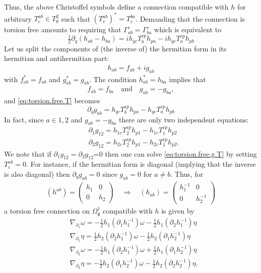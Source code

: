 \documentclass{amsart}
\newcommand{\spacearound}[1]{\quad#1\quad}
\renewcommand{\implies}{\spacearound{\Rightarrow}}
\theoremstyle{definition}
\theoremstyle{remark}
\numberwithin{equation}{section}
\renewcommand{\d}{\partial}
\newcommand{\qand}{\quad\text{and}\quad}
\newcommand{\g}{\mathfrak{g}}
\newcommand{\Omegaoneg}{\Omega^1_{\g}}
\newcommand{\Ttwotheta}{T^2_{\theta}}
\begin{document}
Thus, the above Christoffel symbols define a connection compatible
with $h$ for arbitrary $T^{ab}_c\in\Ttwotheta$ such that
$(T^{ab}_c)^\ast=T^{ba}_c$. Demanding that the connection is torsion
free amounts to requiring that $\Gamma_{ab}^c=\Gamma_{ba}^c$ which is
equivalent to
\begin{equation}\label{eq:torsion.free.T}
  \tfrac{1}{2}\d_q(h_{ab}-h_{ba}) = ih_{qc}T^{cp}_b h_{pa}-ih_{qc}T^{cp}_a h_{pb}
\end{equation}
Let us split the components of (the inverse of) the hermitian form in
its hermitian and antihermitian part:
\begin{align*}
  h_{ab} = f_{ab} + ig_{ab}
\end{align*}
with $f_{ab}^\ast=f_{ab}$ and $g_{ab}^\ast=g_{ab}$. The condition
$h_{ab}^\ast=h_{ba}$ implies that
\begin{align*}
  f_{ab}=f_{ba}\qand
  g_{ab}=-g_{ba},
\end{align*}
and \eqref{eq:torsion.free.T} becomes
\begin{equation}\label{eq:torsion.free.g.T}
  \d_qg_{ab} = h_{qc}T^{cp}_b h_{pa}-h_{qc}T^{cp}_a h_{pb}
\end{equation}
In fact, since $a\in{1,2}$ and $g_{ab}=-g_{ba}$ there are only two
independent equations:
\begin{align}
  &\d_1g_{12} = h_{1c}T^{cp}_2h_{p1}-h_{1c}T^{cp}_1h_{p2}\label{eq:torsionfree.g.1}\\
  &\d_2g_{12} = h_{2c}T^{cp}_2h_{p1}-h_{2c}T^{cp}_1h_{p2}.\label{eq:torsionfree.g.2}
\end{align}
We note that if $\d_1g_{12}=\d_2g_{12}$=0 then one can solve
\eqref{eq:torsion.free.g.T} by setting $T^{ab}_c=0$. For instance, if
the hermitian form is diagonal (implying that the inverse is also
diagonal) then $\d_qg_{ab}=0$ since $g_{ab}=0$ for $a\neq b$. Thus,
for
\begin{align*}
  (h^{ab}) =
  \begin{pmatrix}
    h_1 & 0 \\ 0 & h_2
  \end{pmatrix}\implies
  (h_{ab}) =
  \begin{pmatrix}
    h_1^{-1} & 0 \\ 0 & h_2^{-1}
  \end{pmatrix}
\end{align*}
a torsion free connection on $\Omegaoneg$ compatible with $h$ is given by
\begin{align*}
  &\nabla_{\d_1}\omega = -\tfrac{1}{2}h_1(\d_1h_1^{-1})\omega-\tfrac{1}{2}h_1(\d_2h_1^{-1})\eta\\
  &\nabla_{\d_1}\eta = \tfrac{1}{2}h_2(\d_2h_1^{-1})\omega-\tfrac{1}{2}h_2(\d_1h_2^{-1})\eta\\
  &\nabla_{\d_2}\omega = -\tfrac{1}{2}h_1(\d_2h_1^{-1})\omega+\tfrac{1}{2}h_1(\d_1h_2^{-1})\eta\\
  &\nabla_{\d_2}\eta = -\tfrac{1}{2}h_2(\d_1h_2^{-1})\omega-\tfrac{1}{2}h_2(\d_2h_2^{-1})\eta.
\end{align*}
\end{document}
